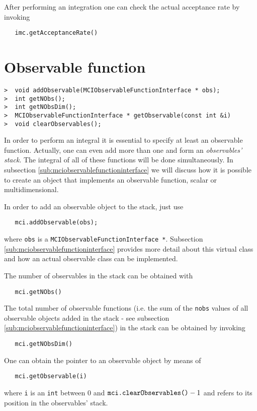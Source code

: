 \documentclass[11pt,a4paper,twoside]{article}
\begin{document}
After performing an integration one can check the actual acceptance rate by invoking
\begin{verbatim}
   imc.getAcceptanceRate()
\end{verbatim}


\section{Observable function} %
\label{sec:observable_function}

\begin{verbatim}
>  void addObservable(MCIObservableFunctionInterface * obs);
>  int getNObs();
>  int getNObsDim();
>  MCIObservableFunctionInterface * getObservable(const int &i)
>  void clearObservables();
\end{verbatim}

In order to perform an integral it is essential to specify at least an observable function.
Actually, one can even add more than one and form an \emph{observables' stack}.
The integral of all of these functions will be done simultaneously.
In subsection \ref{sub:mciobservablefunctioninterface} we will discuss how it is possible to create an object that implements an observable function, scalar or multidimensional.

In order to add an observable object to the stack, just use
\begin{verbatim}
   mci.addObservable(obs);
\end{verbatim}
where \verb+obs+ is a \verb+MCIObservableFunctionInterface *+.
Subsection \ref{sub:mciobservablefunctioninterface} provides more detail about this virtual class and how an actual observable class can be implemented.

The number of observables in the stack can be obtained with
\begin{verbatim}
   mci.getNObs()
\end{verbatim}

The total number of observable functions (i.e. the sum of the \verb+nobs+ values of all observable objects added in the stack - see subsection \ref{sub:mciobservablefunctioninterface}) in the stack can be obtained by invoking
\begin{verbatim}
   mci.getNObsDim()
\end{verbatim}

One can obtain the pointer to an observable object by means of
\begin{verbatim}
   mci.getObservable(i)
\end{verbatim}
where \verb+i+ is an \verb+int+ between $0$ and $\verb+mci.clearObservables()+ -1$ and refers to its position in the observables' stack.
\end{document}
